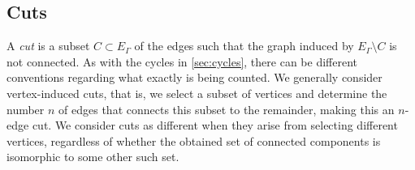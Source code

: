 \documentclass[11pt]{scrartcl}
\numberwithin{equation}{section}
\begin{document}
\subsection{Cuts}\label{sec:cuts}


A \emph{cut} is  a subset $C \subset E_\Gamma$ of the edges such that the graph induced by $E_\Gamma \setminus C$ is not connected.   As with the cycles in \cref{sec:cycles}, there can be different conventions regarding what exactly is being counted. We generally consider vertex-induced cuts, that is, we select a subset of vertices and determine the number $n$ of edges that connects this subset to the remainder, making this an $n$-edge cut. We consider cuts as different when they arise from selecting different vertices, regardless of whether the obtained set of connected components is isomorphic to some other such set.  
\end{document}
